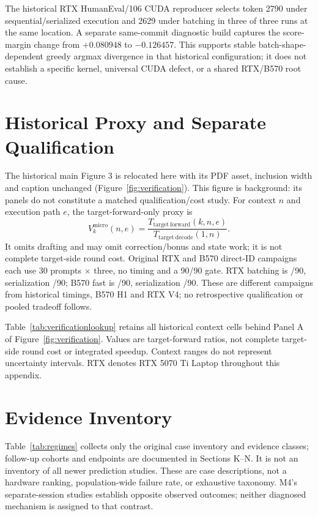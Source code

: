\documentclass{article}
\begin{document}
The historical RTX HumanEval/106 CUDA reproducer selects token 2790 under sequential/serialized execution and 2629 under batching in three of three runs at the same location. A separate same-commit diagnostic build captures the score-margin change from $+0.080948$ to $-0.126457$. This supports stable batch-shape-dependent greedy argmax divergence in that historical configuration; it does not establish a specific kernel, universal CUDA defect, or a shared RTX/B570 root cause.
\section{Historical Proxy and Separate Qualification}
The historical main Figure 3 is relocated here with its PDF asset, inclusion width and caption unchanged (Figure~\ref{fig:verification}). This figure is background: its panels do not constitute a matched qualification/cost study. For context $n$ and execution path $e$, the target-forward-only proxy is
\[
V_k^{\mathrm{micro}}(n,e)=\frac{T_{\mathrm{target\ forward}}(k,n,e)}{T_{\mathrm{target\ decode}}(1,n)}.
\]
It omits drafting and may omit correction/bonus and state work; it is not complete target-side round cost. Original RTX and B570 direct-ID campaigns each use 30 prompts $\times$ three, no timing and a 90/90 gate. RTX batching is \DIRTXBatchedPairs/90, serialization \DIRTXSerializedPairs/90; B570 fast is \DIBFastPairs/90, serialization \DIBSerializedPairs/90. These are different campaigns from historical timings, B570 H1 and RTX V4; no retrospective qualification or pooled tradeoff follows.

Table~\ref{tab:verificationlookup} retains all historical context cells behind Panel A of Figure~\ref{fig:verification}. Values are target-forward ratios, not complete target-side round cost or integrated speedup. Context ranges do not represent uncertainty intervals. RTX denotes RTX 5070 Ti Laptop throughout this appendix.


\section{Evidence Inventory}
Table~\ref{tab:regimes} collects only the original case inventory and evidence classes; follow-up cohorts and endpoints are documented in Sections K--N. It is not an inventory of all newer prediction studies. These are case descriptions, not a hardware ranking, population-wide failure rate, or exhaustive taxonomy. M4's separate-session studies establish opposite observed outcomes; neither diagnosed mechanism is assigned to that contrast.

\end{document}

